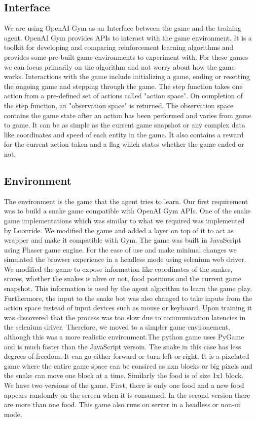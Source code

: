 \documentclass[conference,10pt]{IEEEtran}
\begin{document}
	\subsection{Interface}
	We are using OpenAI Gym\cite{sd3} as an Interface between the game and the training agent. OpenAI Gym provides APIs to interact with the game environment. It is a toolkit for developing and comparing reinforcement learning algorithms and provides some pre-built game environments to experiment with. For these games we can focus primarily on the algorithm and not worry about how the game works. Interactions with the game include initializing a game, ending or resetting the ongoing game and stepping through the game. The step function takes one action from a pre-defined set of actions called "action space". On completion of the step function, an "observation space" is returned. The observation space contains the game state after an action has been performed and varies from game to game. It can be as simple as the current game snapshot  or any complex data like coordinates and speed of each entity in the game. It also contains a reward for the current action taken and a flag which states whether the game ended or not.
	\subsection{Environment}
	The environment is the game that the agent tries to learn. Our first requirement was to build a snake game compatible with OpenAI Gym APIs. One of the snake game implementations which was similar to what we required was implemented by Loonride\cite{sd4}. We modified the game and added a layer on top of it to act as wrapper and make it compatible with Gym. The game was built in JavaScript using Phaser game engine. For the ease of use and make minimal changes we simulated the browser experience in a headless mode using selenium web driver. 
	\break
	\break
	We modified the game to expose information like coordinates of the snakes, scores, whether the snakes is alive or not, food positions and the current game snapshot. This information is used by the agent algorithm to learn the game play. Furthermore, the input to the snake bot was also changed to take inputs from the action space instead of input devices such as mouse or keyboard.
	\break
	Upon training it was discovered that the process was too slow due to communication latencies in the selenium driver. Therefore, we moved to a simpler game environement, although this was a more realistic environment.The python game uses PyGame and is much faster than the JavaScript versoin. The snake in this case has less degrees of freedom. It can go either forward or turn left or right. It is a pixelated game where the entire game space can be consired as nxn blocks or big pixels and the snake can move one block at a time. Similarly the food is of size 1x1 block. We have two versions of the game. First, there is only one food and a new food appears randomly on the screen when it is consumed. In the second version there are more than one food. This game also runs on server in a headless or non-ui mode.
	
\end{document}
